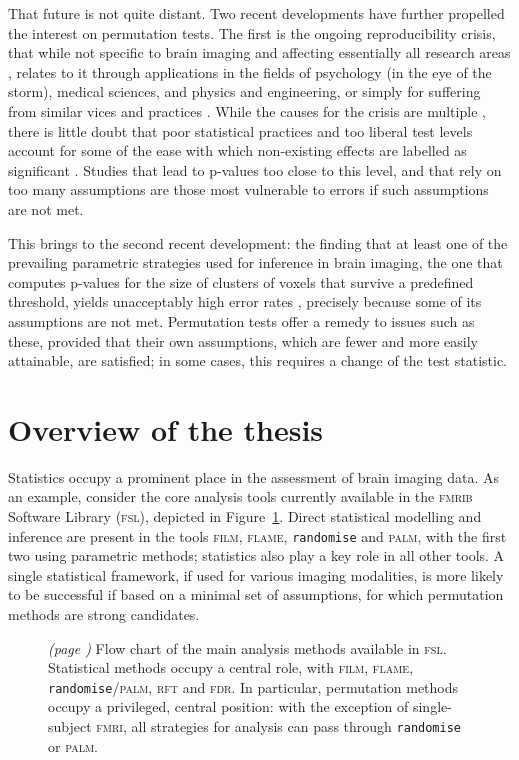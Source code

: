 That future is not quite distant. Two recent developments have further propelled the interest on permutation tests. The first is the ongoing reproducibility crisis, that while not specific to brain imaging and affecting essentially all research areas \citep{Baker2016}, relates to it through applications in the fields of psychology (in the eye of the storm), medical sciences, and physics and engineering, or simply for suffering from similar vices and practices \citep{Carp2012, Gorgolewski2016}. While the causes for the crisis are multiple \citep{Eicken2013, Begley2015}, there is little doubt that poor statistical practices and too liberal test levels account for some of the ease with which non-existing effects are labelled as significant \citep{Ioannidis2011}. Studies that lead to p-values too close to this level, and that rely on too many assumptions are those most vulnerable to errors if such assumptions are not met.

This brings to the second recent development: the finding that at least one of the prevailing parametric strategies used for inference in brain imaging, the one that computes p-values for the size of clusters of voxels that survive a predefined threshold, yields unacceptably high error rates \citep{Eklund2016}, precisely because some of its assumptions are not met. Permutation tests offer a remedy to issues such as these, provided that their own assumptions, which are fewer and more easily attainable, are satisfied; in some cases, this requires a change of the test statistic.

\section{Overview of the thesis}

Statistics occupy a prominent place in the assessment of brain imaging data. As an example, consider the core analysis tools currently available in the \textsc{fmrib} Software Library (\textsc{fsl}), depicted in Figure~\ref{fig:fsl}. Direct statistical modelling and inference are present in the tools \textsc{film}, \textsc{flame}, \texttt{randomise} and \textsc{palm}, with the first two using parametric methods; statistics also play a key role in all other tools. A single statistical framework, if used for various imaging modalities, is more likely to be successful if based on a minimal set of assumptions, for which permutation methods are strong candidates.

\begin{figure}[!b]
\caption[Flow chart of the main analysis methods available in \textsc{fsl}.]{\emph{(page \pageref{fig:fsl_noref})} Flow chart of the main analysis methods available in \textsc{fsl}. Statistical methods occupy a central role, with \textsc{film}, \textsc{flame}, \texttt{randomise}/\textsc{palm}, \textsc{rft} and \textsc{fdr}. In particular, permutation methods occupy a privileged, central position: with the exception of single-subject \textsc{fmri}, all strategies for analysis can pass through \texttt{randomise} or \textsc{palm}.}
\label{fig:fsl}
\end{figure}

